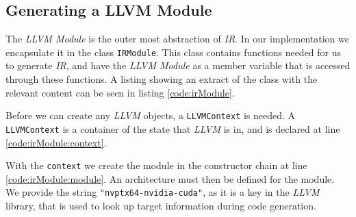 \subsection{Generating a LLVM Module} \label{sec:irmodule}
The \textit{LLVM Module} is the outer most abstraction of \textit{IR}. In our implementation we encapsulate it in the class \texttt{IRModule}. This class contains functions needed for us to generate \textit{IR}, and have the \textit{LLVM Module} as a member variable that is accessed through these functions. A listing showing an extract of the class with the relevant content can be seen in listing \ref{code:irModule}.

Before we can create any \textit{LLVM} objects, a \texttt{LLVMContext} is needed. A \texttt{LLVMContext} is a container of the state that \textit{LLVM} is in, and is declared at line \ref{code:irModule:context}.

With the \texttt{context} we create the module in the constructor chain at line \ref{code:irModule:module}. An architecture must then be defined for the module. We provide the string \texttt{"nvptx64-nvidia-cuda"}, as it is a key in the \textit{LLVM} library, that is used to look up target information during code generation. 

